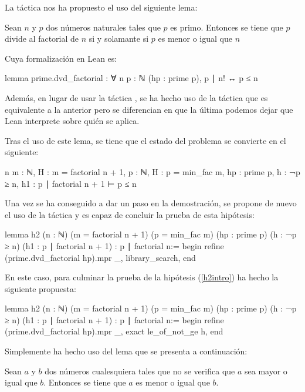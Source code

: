 \begin{itemize}
  La táctica  nos ha propuesto el uso del siguiente
  lema:
  \begin{lema}
    Sean \(n\) y \(p\) dos números naturales tales que \(p\) es
    primo. Entonces se tiene que \(p\) divide al factorial de \(n\) si y
    solamante si \(p\) es menor o igual que \(n\)
  \end{lema}

  Cuya formalización en Lean es:
  \begin{leancode}
  lemma prime.dvd_factorial : ∀ {n p : ℕ} (hp : prime p), p ∣ n! ↔ p ≤ n
  \end{leancode}

  Además, en lugar de usar la táctica , se ha hecho uso
  de la táctica  que es equivalente a la anterior pero
  se diferencian en que la última podemos dejar que Lean interprete sobre
  quién se aplica.

  Tras el uso de este lema, se tiene que el estado del problema se convierte en
  el siguiente:
  \begin{leancode}
  n m : ℕ,
  H : m = factorial n + 1,
  p : ℕ,
  H : p = min_fac m,
  hp : prime p,
  h : ¬p ≥ n,
  h1 : p ∣ factorial n + 1
  ⊢ p ≤ n
  \end{leancode}

  Una vez se ha conseguido a dar un paso en la demostración, se propone de nuevo
  el uso de la táctica  y es capaz de
  concluir la prueba de esta hipótesis:
  \begin{leancode}
lemma h2
  (n : ℕ)
  (m = factorial n + 1)
  (p = min_fac m)
  (hp : prime p)
  (h : ¬p ≥ n)
  (h1 : p ∣ factorial n + 1)
  : p ∣ factorial n:=
begin
  refine (prime.dvd_factorial hp).mpr _,
  library_search,
end
  \end{leancode}

  En este caso, para culminar la prueba de la hipótesis (\ref{h2intro}) ha
  hecho la siguiente propuesta:
  \begin{leancode}
lemma h2
  (n : ℕ)
  (m = factorial n + 1)
  (p = min_fac m)
  (hp : prime p)
  (h : ¬p ≥ n)
  (h1 : p ∣ factorial n + 1)
  : p ∣ factorial n:=
begin
  refine (prime.dvd_factorial hp).mpr _,
  exact le_of_not_ge h,
end
  \end{leancode}

  Simplemente ha hecho uso del lema que se presenta a continuación:
  \begin{lema}
    Sean \(a\) y \(b\) dos números cualesquiera tales que no se verifica que
    \(a\) sea mayor o igual que \(b\). Entonces se tiene que \(a\) es menor o
    igual que \(b\).
  \end{lema}


\end{itemize}
